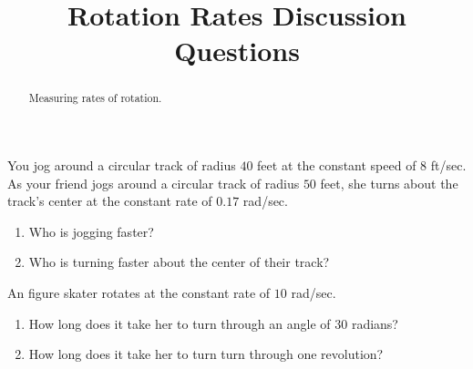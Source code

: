 \documentclass{ximera}
\title{Rotation Rates Discussion Questions}
\begin{document}
\begin{abstract}
Measuring rates of rotation.
\end{abstract}
\maketitle







\begin{question} \label{Qldsfsda4trgfvbvb}
You jog around a circular track of radius $40$ feet at the constant speed of $8$ ft/sec. As your friend jogs around a circular track of radius $50$ feet, she turns about the track's center at the constant rate of $0.17$ rad/sec.

\begin{enumerate}
\item Who is jogging faster?

\item Who is turning faster about the center of their track? 

\end{enumerate}
\end{question}

\begin{question} \label{Qodfdstr43}
An figure skater rotates at the constant rate of $10$ rad/sec. 
\begin{enumerate}
\item How long does it take her to turn through an angle of $30$ radians?

\item How long does it take her to turn turn through one revolution?

\end{enumerate}
\end{question}
\end{document}
